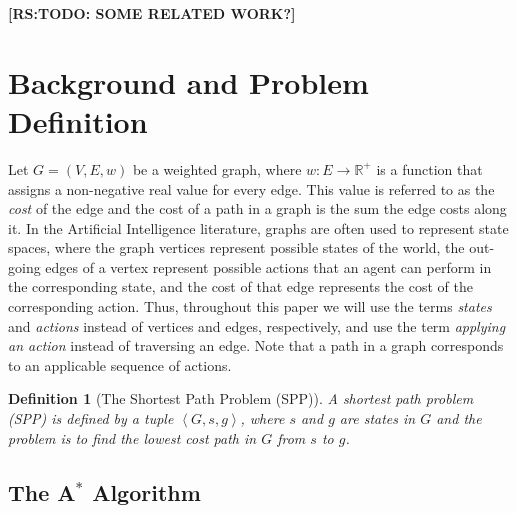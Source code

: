 \documentclass{aicom2e}
\newtheorem{definition}{Definition}
\newcommand{\astar}{A$^*$}
\newcommand{\tuple}[1]{\ensuremath{\left \langle #1 \right \rangle }}
\newcommand{\roni}[1]{\textbf{[RS:#1]}}
\begin{document}
\roni{TODO: SOME RELATED WORK?}

\section{Background and Problem Definition}


Let $G=(V,E,w)$ be a weighted graph, where $w:E\rightarrow \mathbb{R}^+$ is a function that assigns a non-negative real value for every edge. This value is referred to as the {\em cost} of the edge and the cost of a path in a graph is  the sum the edge costs along it. 
In the Artificial Intelligence literature, graphs are often used to represent state spaces, 
where the graph vertices represent possible states of the world, the out-going edges of a vertex represent possible actions that an agent can perform in the corresponding state, and the cost of that edge represents the cost of the corresponding action. 
Thus, throughout this paper we will use the terms {\em states} and {\em actions} instead of vertices and edges, respectively, and use the term {\em applying an action} instead of traversing an edge. Note that a path in a graph corresponds to an applicable sequence of actions. 

\begin{definition}[The Shortest Path Problem (SPP)]
A shortest path problem (SPP) is defined by a tuple $\tuple{G,s, g}$, 
where $s$ and $g$ are states in $G$ and the problem is to find the lowest cost path in $G$ from $s$ to $g$. 
\label{def:spp}
\end{definition}

\subsection{The \astar{} Algorithm}
\end{document}
